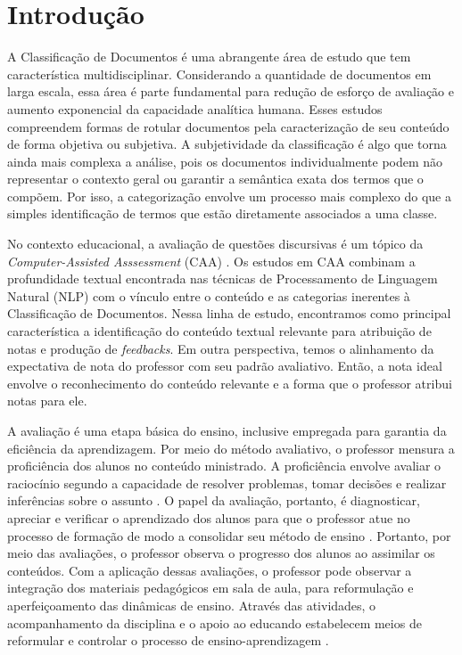 \chapter{Introdução}
\label{cap1-intro}

A Classificação de Documentos é uma abrangente área de estudo que tem característica multidisciplinar. Considerando a quantidade de documentos em larga escala, essa área é parte fundamental para redução de esforço de avaliação e aumento exponencial da capacidade analítica humana. Esses estudos compreendem formas de rotular documentos pela caracterização de seu conteúdo de forma objetiva ou subjetiva. A subjetividade da classificação é algo que torna ainda mais complexa a análise, pois os documentos individualmente podem não representar o contexto geral ou garantir a semântica exata dos termos que o compõem. Por isso, a categorização envolve um processo mais complexo do que a simples identificação de termos que estão diretamente associados a uma classe.

No contexto educacional, a avaliação de questões discursivas é um tópico da \textit{Computer-Assisted Asssessment} (CAA) \cite{bogarin2018}. Os estudos em CAA combinam a profundidade textual encontrada nas técnicas de Processamento de Linguagem Natural (NLP) com o vínculo entre o conteúdo e as categorias inerentes à Classificação de Documentos. Nessa linha de estudo, encontramos como principal característica a identificação do conteúdo textual relevante para atribuição de notas e produção de \textit{feedbacks}. Em outra perspectiva, temos o alinhamento da expectativa de nota do professor com seu padrão avaliativo. Então, a nota ideal envolve o reconhecimento do conteúdo relevante e a forma que o professor atribui notas para ele. 

A avaliação é uma etapa básica do ensino, inclusive empregada para garantia da eficiência da aprendizagem. Por meio do método avaliativo, o professor mensura a proficiência dos alunos no conteúdo ministrado. A proficiência envolve avaliar o raciocínio segundo a capacidade de resolver problemas, tomar decisões e realizar inferências sobre o assunto \cite{casiraghi2017}. O papel da avaliação, portanto, é diagnosticar, apreciar e verificar o aprendizado dos alunos para que o professor atue no processo de formação de modo a consolidar seu método de ensino \cite{oliveira2005}. Portanto, por meio das avaliações, o professor observa o progresso dos alunos ao assimilar os conteúdos. Com a aplicação dessas avaliações, o professor pode observar a integração dos materiais pedagógicos em sala de aula, para reformulação e aperfeiçoamento das dinâmicas de ensino. Através das atividades, o acompanhamento da disciplina e o apoio ao educando estabelecem meios de reformular e controlar o processo de ensino-aprendizagem \cite{barreira2006}.

